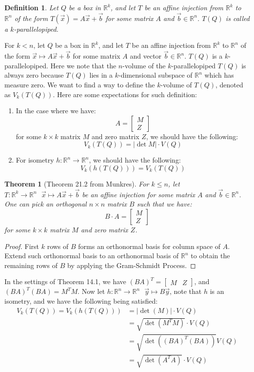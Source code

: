\documentclass[15pt]{book}
\theoremstyle{break}
\theoremstyle{break}
\newtheorem{thm}{Theorem}[section]
\newtheorem{defn}{Definition}[corL]
\newcommand{\R}{\mathbb{R}}
\newcommand{\bmat}[1]{\begin{bmatrix} #1 \end{bmatrix}}
\begin{document}
\begin{defn}
Let $Q$ be a box in $\R^k$, and let $T$ be an affine injection from $\R^k$ to $\R^n$ of the form $T(\vec{x}) = A\vec{x}+\vec{b}$ for some matrix $A$ and $\vec{b}\in \R^n$. $T(Q)$ is called a $k$-parallelopiped.
\end{defn}

For $k<n$, let $Q$ be a box in $\R^k$, and let $T$ be an affine injection from $\R^k$ to $\R^n$ of the form $\vec{x}\mapsto A\vec{x}+\vec{b}$ for some matrix $A$ and vector $\vec{b}\in \R^n$. $T(Q)$ is a $k$-parallelopiped. Here we note that the $n$-volume of the $k$-parallelopiped $T(Q)$ is always zero because $T(Q)$ lies in a $k$-dimensional subspace of $\R^n$ which has measure zero. We want to find a way to define the $k$-volume of $T(Q)$, denoted as $V_k(T(Q))$. Here are some expectations for such definition: 
\begin{enumerate}[topsep=3pt,itemsep=-1ex,partopsep=1ex,parsep=1ex]
\item In the case where we have: 
$$A = \bmat{M \\ Z}$$ for some $k\times k$ matrix $M$ and zero matrix $Z$, we should have the following: $$V_k(T(Q))= |\det M|\cdot V(Q)$$
\item For isometry $h:\R^n \to \R^n$, we should have the following: $$V_k(h(T(Q))) = V_k(T(Q))$$
\end{enumerate}


\hfill\break
\begin{thm}[Theorem 21.2 from Munkres] 
For $k\leq n$, let $T:\R^k \to \R^n \ \ \ \vec{x} \mapsto A\vec{x}+\vec{b}$ be an affine injection for some matrix $A$ and $\vec{b}\in \R^n$. One can pick an orthogonal $n \times n$ matrix $B$ such that we have: $$B\cdot A= \bmat{M \\ Z}$$ for some $k\times k$ matrix $M$ and zero matrix $Z$.
\end{thm}
\begin{proof}
First $k$ rows of $B$ forms an orthonormal basis for column space of $A$. Extend such orthonormal basis to an orthonormal basis of $\R^n$ to obtain the remaining rows of $B$ by applying the Gram-Schmidt Process. 
\end{proof}


In the settings of Theorem 14.1, we have $(BA)^T = \bmat{M& Z}$, and $(BA)^T (BA) = M^TM$. Now let $h:\R^n \to \R^n \ \ \ \vec{y}\mapsto B\vec{y}$, note that $h$ is an isometry, and we have the following being satisfied:
\begin{align*}
V_k(T(Q)) = V_k(h(T(Q))) &= |\det(M)|\cdot V(Q) \\&= \sqrt{\det(M^TM)}\cdot V(Q) \\&= \sqrt{\det((BA)^T(BA))}V(Q) \\&= \sqrt{\det(A^TA)}\cdot V(Q)
\end{align*}
\end{document}
